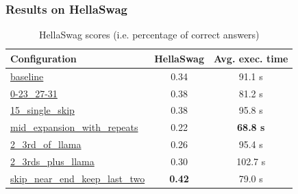 \documentclass{beamer}
\begin{document}
\begin{frame}
  \frametitle{Results on HellaSwag}
  \begin{table}[h]
    \centering
    \begin{tabular}{|l|c|c|}
        \hline
        \textbf{Configuration} & \textbf{HellaSwag} & \textbf{Avg. exec. time} \\ \hline
        \url{baseline} & 0.34 & 91.1 s\\ \hline
        \url{0-23_27-31} & 0.38 & 81.2 s\\ \hline
        \url{15_single_skip} & 0.38 & 95.8 s\\ \hline
        \url{mid_expansion_with_repeats} & 0.22 & \textbf{68.8 s} \\ \hline
        \url{2_3rd_of_llama} & 0.26 & 95.4 s\\ \hline
        \url{2_3rds_plus_llama} & 0.30 & 102.7 s\\ \hline
        \url{skip_near_end_keep_last_two} & \textbf{0.42} & 79.0 s\\ \hline
    \end{tabular}
    \caption{HellaSwag scores (i.e. percentage of correct answers)}
    \label{tab:model_comparison}
\end{table}
\end{frame}

\end{document}
